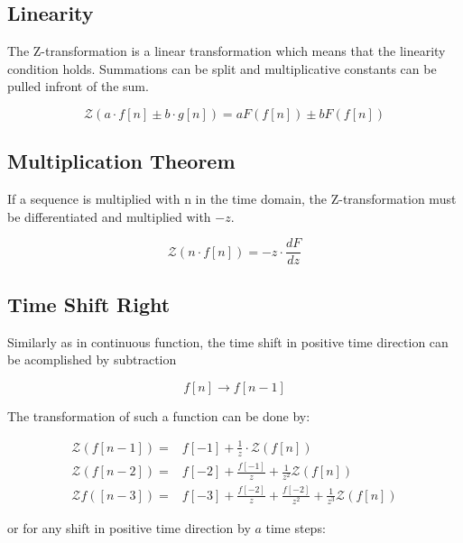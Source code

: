 \documentclass[./\jobname.tex]{subfiles}
\begin{document}
\subsection{Linearity}
The Z-transformation is a linear transformation which means that the linearity condition holds. Summations can be split and multiplicative constants can be pulled infront of the sum. 

\begin{equation}
	\mathcal{Z} \left( a \cdot f[n]  \pm b \cdot g[n] \right) = a F(f[n]) \pm b F(f[n])
\end{equation}

\subsection{Multiplication Theorem}

If a sequence is multiplied with n in the time domain, the Z-transformation must be differentiated and multiplied with $-z$. 

\begin{equation}
	\mathcal{Z} (n \cdot f[n]) = -z \cdot \frac{dF}{dz}
\end{equation}

\subsection{Time Shift Right}

Similarly as in continuous function, the time shift in positive time direction can be acomplished by subtraction

\begin{equation}
	f[n] \rightarrow f[n-1]
\end{equation}

The transformation of such a function can be done by:

\begin{equation}
	\begin{split}
		\mathcal{Z} (f[n-1]) = & f[-1] + \frac{1}{z} \cdot \mathcal{Z}(f[n]) \\
		\mathcal{Z} (f[n-2]) = & f[-2] + \frac{f[-1]}{z} + \frac{1}{z^2} \mathcal{Z}(f[n]) \\
		\mathcal{Z} f([n-3]) = & f[-3] + \frac{f[-2]}{z} + \frac{f[-2]}{z^2} + \frac{1}{z^3} \mathcal{Z}(f[n])
	\end{split}
\end{equation}

or for any shift in positive time direction by $a$ time steps: 
\end{document}
